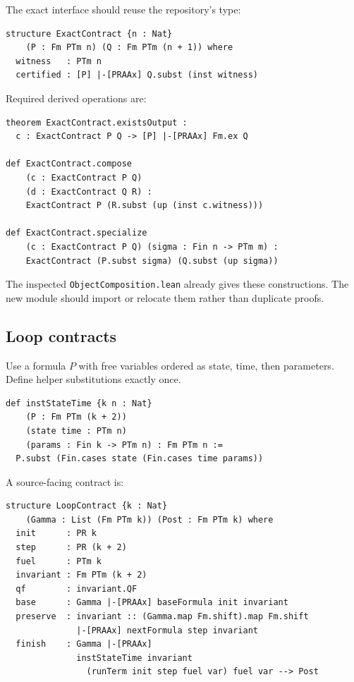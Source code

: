 The exact interface should reuse the repository's type:

\begin{lstlisting}[language={},caption={Exact object contract}]
structure ExactContract {n : Nat}
    (P : Fm PTm n) (Q : Fm PTm (n + 1)) where
  witness   : PTm n
  certified : [P] |-[PRAAx] Q.subst (inst witness)
\end{lstlisting}

Required derived operations are:

\begin{lstlisting}[language={}]
theorem ExactContract.existsOutput :
  c : ExactContract P Q -> [P] |-[PRAAx] Fm.ex Q

def ExactContract.compose
    (c : ExactContract P Q)
    (d : ExactContract Q R) :
    ExactContract P (R.subst (up (inst c.witness)))

def ExactContract.specialize
    (c : ExactContract P Q) (sigma : Fin n -> PTm m) :
    ExactContract (P.subst sigma) (Q.subst (up sigma))
\end{lstlisting}

The inspected \texttt{ObjectComposition.lean} already gives these constructions.  The new module should import or relocate them rather than duplicate proofs.

\subsection{Loop contracts}

Use a formula \(P\) with free variables ordered as state, time, then parameters.  Define helper substitutions exactly once.

\begin{lstlisting}[language={}]
def instStateTime {k n : Nat}
    (P : Fm PTm (k + 2))
    (state time : PTm n)
    (params : Fin k -> PTm n) : Fm PTm n :=
  P.subst (Fin.cases state (Fin.cases time params))
\end{lstlisting}

A source-facing contract is:

\begin{lstlisting}[language={}]
structure LoopContract {k : Nat}
    (Gamma : List (Fm PTm k)) (Post : Fm PTm k) where
  init      : PR k
  step      : PR (k + 2)
  fuel      : PTm k
  invariant : Fm PTm (k + 2)
  qf        : invariant.QF
  base      : Gamma |-[PRAAx] baseFormula init invariant
  preserve  : invariant :: (Gamma.map Fm.shift).map Fm.shift
              |-[PRAAx] nextFormula step invariant
  finish    : Gamma |-[PRAAx]
              instStateTime invariant
                (runTerm init step fuel var) fuel var --> Post
\end{lstlisting}

